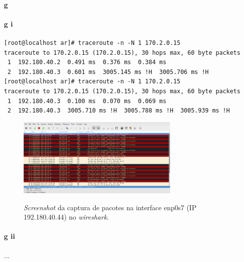 \paragraph{g}

\paragraph{g i}
\begin{verbatim}
[root@localhost ar]# traceroute -n -N 1 170.2.0.15
traceroute to 170.2.0.15 (170.2.0.15), 30 hops max, 60 byte packets
 1  192.180.40.2  0.491 ms  0.376 ms  0.384 ms
 2  192.180.40.3  0.601 ms  3005.145 ms !H  3005.706 ms !H
[root@localhost ar]# traceroute -n -N 1 170.2.0.15
traceroute to 170.2.0.15 (170.2.0.15), 30 hops max, 60 byte packets
 1  192.180.40.3  0.100 ms  0.070 ms  0.069 ms
 2  192.180.40.3  3005.710 ms !H  3005.788 ms !H  3005.939 ms !H
\end{verbatim}

\begin{figure}[h]
\centering
\includegraphics[width=0.7\textwidth]{1_g1_screenshot.png}
\label{fig:wireshark-enp0s7}
\caption{\emph{Screenshot} da captura de pacotes na interface enp0s7 (IP 192.180.40.44) no \emph{wireshark}.}
\end{figure}

\paragraph{g ii}
...